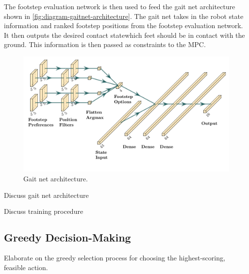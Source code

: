 The footstep evaluation network is then used to feed the gait net
architecture shown in \autoref{fig:diagram-gaitnet-architecture}. The
gait net takes in the robot state information and ranked footstep
positions from the footstep evaluation network. It then outputs the
desired contact state\textemdash which feet should be in contact with
the ground. This information is then passed as constraints to the MPC.

\begin{figure}
  \centering
  \includegraphics[width=0.5\linewidth]{images/diagrams/gait-network-architecture.png}
  \caption{Gait net architecture.}
  \label{fig:diagram-gaitnet-architecture}
\end{figure}

\begin{todo}
  Discuss gait net architecture
\end{todo}

\begin{todo}
  Discuss training procedure
\end{todo}

\subsection{Greedy Decision-Making}

\begin{outline}
  Elaborate on the greedy selection process for choosing the
  highest-scoring, feasible action.
\end{outline}
